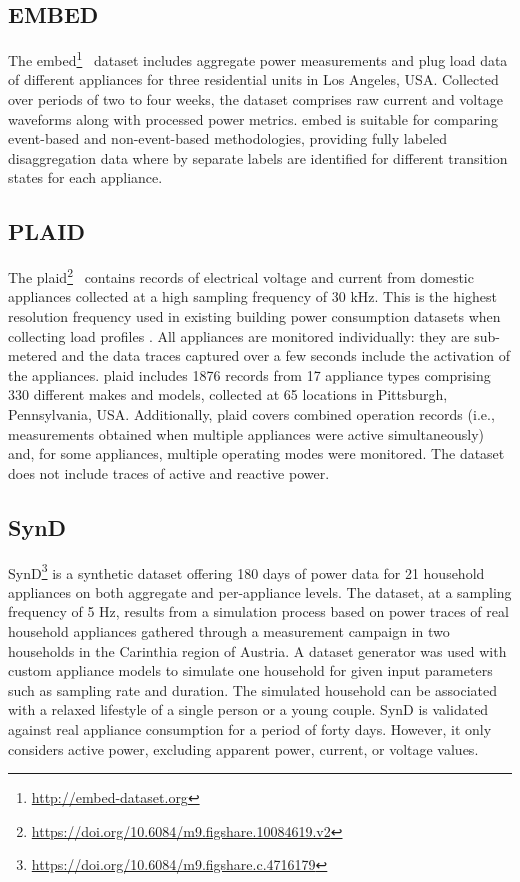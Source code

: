 \subsection{EMBED}

The \acrlong{embed}\footnote{\url{http://embed-dataset.org}}~\parencite{jazizadeh_embed_2018} dataset includes aggregate power measurements and plug load data of different appliances for three residential units in Los Angeles, USA. Collected over periods of two to four weeks, the dataset comprises raw current and voltage waveforms along with processed power metrics. \acrshort{embed} is suitable for comparing event-based and non-event-based methodologies, providing fully labeled disaggregation data where by separate labels are identified for different transition states for each appliance.

\subsection{PLAID}

The \acrlong{plaid}\footnote{\url{https://doi.org/10.6084/m9.figshare.10084619.v2}}~\parencite{medico_voltage_2020} contains records of electrical voltage and current from domestic appliances collected at a high sampling frequency of 30 kHz. This is the highest resolution frequency used in existing building power consumption datasets when collecting load profiles \parencite{himeur_building_2020}. All appliances are monitored individually: they are sub-metered and the data traces captured over a few seconds include the activation of the appliances. \acrshort{plaid} includes 1876 records from 17 appliance types comprising 330 different makes and models, collected at 65 locations in Pittsburgh, Pennsylvania, USA. Additionally, \acrshort{plaid} covers combined operation records (i.e., measurements obtained when multiple appliances were active simultaneously) and, for some appliances, multiple operating modes were monitored. The dataset does not include traces of active and reactive power.

\subsection{SynD}

SynD\footnote{\url{https://doi.org/10.6084/m9.figshare.c.4716179}} \parencite{klemenjak_synthetic_2020} is a synthetic dataset offering 180 days of  power data for 21 household appliances on both aggregate and per-appliance levels. The dataset, at a sampling frequency of 5 Hz, results from a simulation process based on power traces of real household appliances gathered through a measurement campaign in two households in the Carinthia region of Austria. A dataset generator was used with custom appliance models to simulate one household for given input parameters such as sampling rate and duration. The simulated household can be associated with a relaxed lifestyle of a single person or a young couple. SynD is validated against real appliance consumption for a period of forty days. However, it only considers active power, excluding apparent power, current, or voltage values.

